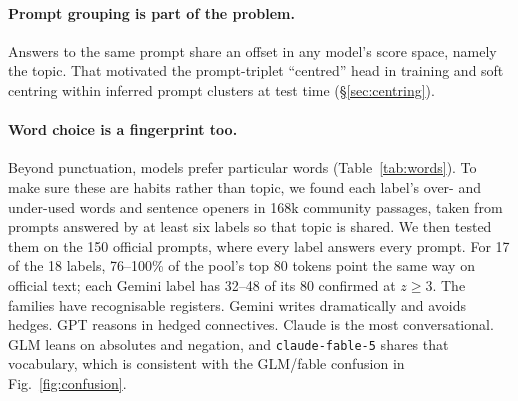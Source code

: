 \documentclass[10pt,twocolumn,letterpaper]{article}
\begin{document}
\paragraph{Prompt grouping is part of the problem.} Answers to the same prompt share an offset in any model's score space, namely the topic. That motivated the prompt-triplet ``centred'' head in training and soft centring within inferred prompt clusters at test time (\S\ref{sec:centring}).

\paragraph{Word choice is a fingerprint too.} Beyond punctuation, models prefer particular words (Table~\ref{tab:words}). To make sure these are habits rather than topic, we found each label's over- and under-used words and sentence openers in 168k community passages, taken from prompts answered by at least six labels so that topic is shared. We then tested them on the 150 official prompts, where every label answers every prompt. For 17 of the 18 labels, 76--100\% of the pool's top 80 tokens point the same way on official text; each Gemini label has 32--48 of its 80 confirmed at $z\geq3$. The families have recognisable registers. Gemini writes dramatically and avoids hedges. GPT reasons in hedged connectives. Claude is the most conversational. GLM leans on absolutes and negation, and \texttt{claude-fable-5} shares that vocabulary, which is consistent with the GLM/fable confusion in Fig.~\ref{fig:confusion}.
\end{document}
